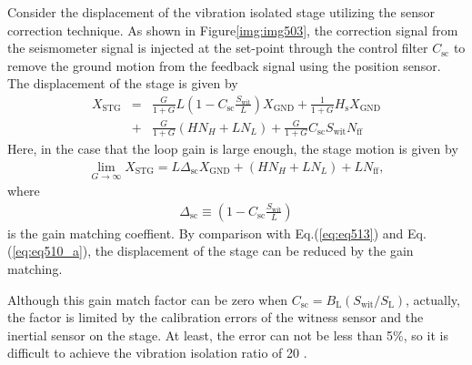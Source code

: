 Consider the displacement of the vibration isolated stage utilizing the sensor correction technique. As shown in Figure\ref{img:img503}, the correction signal from the seismometer signal is injected at the set-point through the control filter $C_{\mathrm{sc}}$ to remove the ground motion from the feedback signal using the position sensor. The displacement of the stage is given by 
\begin{eqnarray}\nonumber
  X_{\mathrm{STG}} &=&\frac{G}{1+G}L\left(1-C_{\mathrm{sc}}\frac{S_{\mathrm{wit}}}{L}\right) X_{\mathrm{GND}} + \frac{1}{1+G}H_{\mathrm{s}}X_{\mathrm{GND}}\\ 
  &+& \frac{G}{1+G}\left(HN_{H}+LN_{L}\right) + \frac{G}{1+G}C_{\mathrm{sc}}S_{\mathrm{wit}}N_{\mathrm{ff}} \label{eq:eq511}
\end{eqnarray}
Here, in the case that the loop gain is large enough, the stage motion is given by 
\begin{eqnarray}
  \lim_{G\to\infty} X_{\mathrm{STG}} = L\Delta_{\mathrm{sc}} X_{\mathrm{GND}} + \left(HN_{H}+LN_{L}\right) + {L}N_{\mathrm{ff}} \label{eq:eq513},
\end{eqnarray}
where 
\begin{eqnarray}
  \Delta_{\mathrm{sc}} \equiv \left(1-C_{\mathrm{sc}}\frac{S_{\mathrm{wit}}}{L}\right) \label{eq:eq512}
\end{eqnarray}
is the gain matching coeffient. By comparison with Eq.(\ref{eq:eq513}) and Eq.(\ref{eq:eq510_a}), the displacement of the stage can be reduced by the gain matching.

Although this gain match factor can be zero when $C_{\mathrm{sc}}=B_{\mathrm{L}}(S_{\mathrm{wit}}/S_{\mathrm{L}})$, actually, the factor is limited by the calibration errors of the witness sensor and the inertial sensor on the stage. At least, the error can not be less than 5\%, so it is difficult to achieve the vibration isolation ratio of 20 \cite{hua2005low}.

